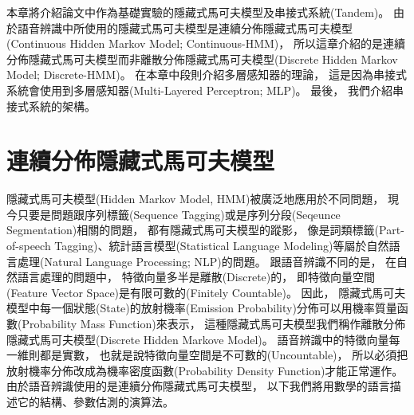 本章將介紹論文中作為基礎實驗的隱藏式馬可夫模型及串接式系統(Tandem)。
由於語音辨識中所使用的隱藏式馬可夫模型是連續分佈隱藏式馬可夫模型(Continuous Hidden Markov Model; Continuous-HMM)，
所以這章介紹的是連續分佈隱藏式馬可夫模型而非離散分佈隱藏式馬可夫模型(Discrete Hidden Markov Model; Discrete-HMM)。
在本章中段則介紹多層感知器的理論，
這是因為串接式系統會使用到多層感知器(Multi-Layered Perceptron; MLP)。
最後，
我們介紹串接式系統的架構。

\section{連續分佈隱藏式馬可夫模型}
  隱藏式馬可夫模型(Hidden Markov Model, HMM)被廣泛地應用於不同問題，
  現今只要是問題跟序列標籤(Sequence Tagging)或是序列分段(Seqeunce Segmentation)相關的問題，
  都有隱藏式馬可夫模型的蹤影，
  像是詞類標籤(Part-of-speech Tagging)、統計語言模型(Statistical Language Modeling)等屬於自然語言處理(Natural Language Processing; NLP)的問題。
  跟語音辨識不同的是，
  在自然語言處理的問題中，
  特徵向量多半是離散(Discrete)的，
  即特徵向量空間(Feature Vector Space)是有限可數的(Finitely Countable)。
  因此，
  隱藏式馬可夫模型中每一個狀態(State)的放射機率(Emission Probability)分佈可以用機率質量函數(Probability Mass Function)來表示，
  這種隱藏式馬可夫模型我們稱作離散分佈隱藏式馬可夫模型(Discrete Hidden Markove Model)。
  語音辨識中的特徵向量每一維則都是實數，
  也就是說特徵向量空間是不可數的(Uncountable)，
  所以必須把放射機率分佈改成為機率密度函數(Probability Density Function)才能正常運作。
  由於語音辨識使用的是連續分佈隱藏式馬可夫模型，
  以下我們將用數學的語言描述它的結構、參數估測的演算法。
  
